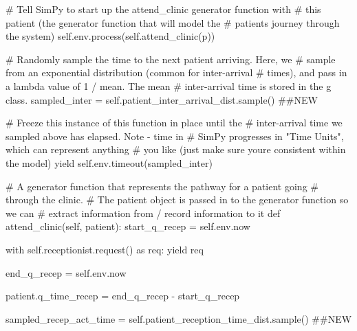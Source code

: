 \documentclass[
  letterpaper,
  DIV=11,
  numbers=noendperiod]{scrreprt}
\newenvironment{Shaded}{\begin{snugshade}}{\end{snugshade}}
\newcommand{\CommentTok}[1]{\textcolor[rgb]{0.37,0.37,0.37}{#1}}
\newcommand{\ControlFlowTok}[1]{\textcolor[rgb]{0.00,0.23,0.31}{#1}}
\newcommand{\ImportTok}[1]{\textcolor[rgb]{0.00,0.46,0.62}{#1}}
\newcommand{\KeywordTok}[1]{\textcolor[rgb]{0.00,0.23,0.31}{#1}}
\newcommand{\NormalTok}[1]{\textcolor[rgb]{0.00,0.23,0.31}{#1}}
\newcommand{\OperatorTok}[1]{\textcolor[rgb]{0.37,0.37,0.37}{#1}}
\newcommand{\VariableTok}[1]{\textcolor[rgb]{0.07,0.07,0.07}{#1}}
\begin{document}
\begin{tcolorbox}
\begin{Shaded}
\begin{Highlighting}[]
            \CommentTok{\# Tell SimPy to start up the attend\_clinic generator function with}
            \CommentTok{\# this patient (the generator function that will model the}
            \CommentTok{\# patient\textquotesingle{}s journey through the system)}
            \VariableTok{self}\NormalTok{.env.process(}\VariableTok{self}\NormalTok{.attend\_clinic(p))}

            \CommentTok{\# Randomly sample the time to the next patient arriving.  Here, we}
            \CommentTok{\# sample from an exponential distribution (common for inter{-}arrival}
            \CommentTok{\# times), and pass in a lambda value of 1 / mean.  The mean}
            \CommentTok{\# inter{-}arrival time is stored in the g class.}
\NormalTok{            sampled\_inter }\OperatorTok{=} \VariableTok{self}\NormalTok{.patient\_inter\_arrival\_dist.sample() }\CommentTok{\#\#NEW}

            \CommentTok{\# Freeze this instance of this function in place until the}
            \CommentTok{\# inter{-}arrival time we sampled above has elapsed.  Note {-} time in}
            \CommentTok{\# SimPy progresses in "Time Units", which can represent anything}
            \CommentTok{\# you like (just make sure you\textquotesingle{}re consistent within the model)}
            \ControlFlowTok{yield} \VariableTok{self}\NormalTok{.env.timeout(sampled\_inter)}

    \CommentTok{\# A generator function that represents the pathway for a patient going}
    \CommentTok{\# through the clinic.}
    \CommentTok{\# The patient object is passed in to the generator function so we can}
    \CommentTok{\# extract information from / record information to it}
    \KeywordTok{def}\NormalTok{ attend\_clinic(}\VariableTok{self}\NormalTok{, patient):}
\NormalTok{        start\_q\_recep }\OperatorTok{=} \VariableTok{self}\NormalTok{.env.now}

        \ControlFlowTok{with} \VariableTok{self}\NormalTok{.receptionist.request() }\ImportTok{as}\NormalTok{ req:}
            \ControlFlowTok{yield}\NormalTok{ req}

\NormalTok{            end\_q\_recep }\OperatorTok{=} \VariableTok{self}\NormalTok{.env.now}

\NormalTok{            patient.q\_time\_recep }\OperatorTok{=}\NormalTok{ end\_q\_recep }\OperatorTok{{-}}\NormalTok{ start\_q\_recep}

\NormalTok{            sampled\_recep\_act\_time }\OperatorTok{=} \VariableTok{self}\NormalTok{.patient\_reception\_time\_dist.sample() }\CommentTok{\#\#NEW}


\end{Highlighting}
\end{Shaded}
\end{tcolorbox}
\end{document}
